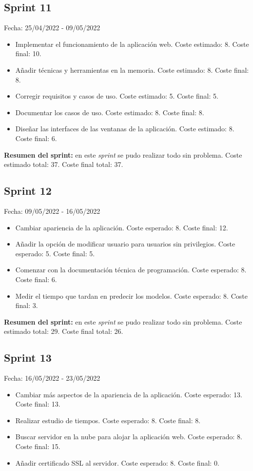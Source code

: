\subsection{Sprint 11}
Fecha: 25/04/2022 - 09/05/2022
\begin{itemize}
	\item Implementar el funcionamiento de la aplicación web. Coste estimado: 8. Coste final: 10.
	\item Añadir técnicas y herramientas en la memoria. Coste estimado: 8. Coste final: 8.
	\item Corregir requisitos y casos de uso. Coste estimado: 5. Coste final: 5.
	\item Documentar los casos de uso. Coste estimado: 8. Coste final: 8.
	\item Diseñar las interfaces de las ventanas de la aplicación. Coste estimado: 8. Coste final: 6.
\end{itemize}

\textbf{Resumen del sprint:} en este \textit{sprint} se pudo realizar todo sin problema. Coste estimado total: 37. Coste final total: 37.

\subsection{Sprint 12}
Fecha: 09/05/2022 - 16/05/2022
\begin{itemize}
	\item Cambiar apariencia de la aplicación. Coste esperado: 8. Coste final: 12.
	\item Añadir la opción de modificar usuario para usuarios sin privilegios. Coste esperado: 5. Coste final: 5.
	\item Comenzar con la documentación técnica de programación. Coste esperado: 8. Coste final: 6.
	\item Medir el tiempo que tardan en predecir los modelos. Coste esperado: 8. Coste final: 3.
\end{itemize}

\textbf{Resumen del sprint:} en este \textit{sprint} se pudo realizar todo sin problema. Coste estimado total: 29. Coste final total: 26.

\subsection{Sprint 13}
Fecha: 16/05/2022 - 23/05/2022
\begin{itemize}
	\item Cambiar más aspectos de la apariencia de la aplicación. Coste esperado: 13. Coste final: 13.
	\item Realizar estudio de tiempos. Coste esperado: 8. Coste final: 8.
	\item Buscar servidor en la nube para alojar la aplicación web. Coste esperado: 8. Coste final: 15.
	\item Añadir certificado SSL al servidor. Coste esperado: 8. Coste final: 0.
\end{itemize}

